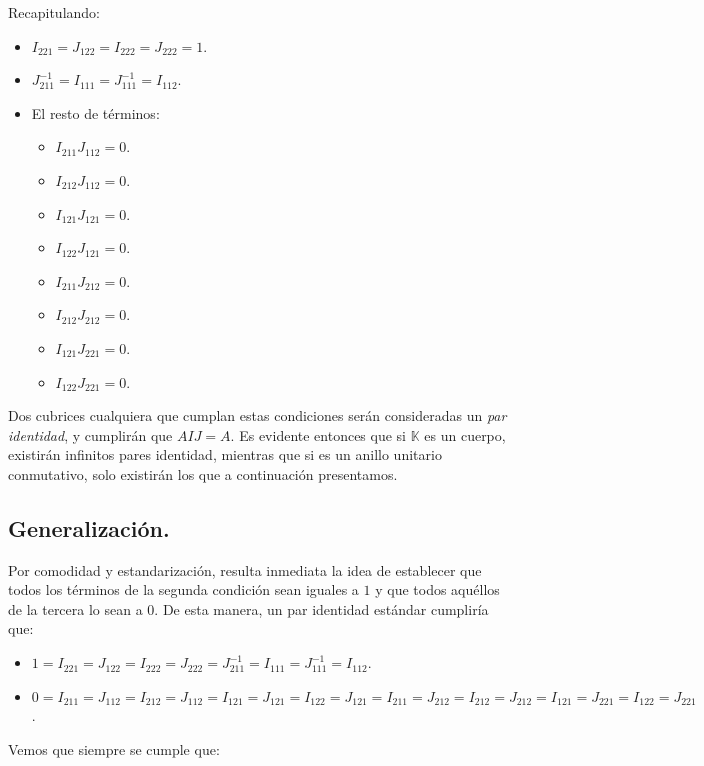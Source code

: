 \documentclass[a4paper, titlepage]{article}
\begin{document}
Recapitulando:

\begin{itemize}
	\item $I_{221} = J_{122} = I_{222} = J_{222} = 1$.
	\item $J_{211}^{-1} = I_{111} = J_{111}^{-1} = I_{112}$.
	\item El resto de términos:

	\begin{itemize}
		\item $I_{211} J_{112} = 0$.
		\item $I_{212} J_{112} = 0$.
		\item $I_{121} J_{121} = 0$.
		\item $I_{122} J_{121} = 0$.
		\item $I_{211} J_{212} = 0$.
		\item $I_{212} J_{212} = 0$.
		\item $I_{121} J_{221} = 0$.
		\item $I_{122} J_{221} = 0$.
	\end{itemize}
\end{itemize}

Dos cubrices cualquiera que cumplan estas condiciones serán consideradas un \textit{par identidad}, y cumplirán que $AIJ = A$. Es evidente entonces que si $\mathbb{K}$ es un cuerpo, existirán infinitos pares identidad, mientras que si es un anillo unitario conmutativo, solo existirán los que a continuación presentamos.

\subsection{Generalización.}

Por comodidad y estandarización, resulta inmediata la idea de establecer que todos los términos de la segunda condición sean iguales a $1$ y que todos aquéllos de la tercera lo sean a $0$. De esta manera, un par identidad estándar cumpliría que:

\begin{itemize}
	\item $1 = I_{221} = J_{122} = I_{222} = J_{222} = J_{211}^{-1} = I_{111} = J_{111}^{-1} = I_{112}$.
	\item $0 = I_{211} = J_{112} = I_{212} = J_{112} = I_{121} = J_{121} = I_{122} = J_{121} = I_{211} = J_{212} = I_{212} = J_{212} = I_{121} = J_{221} = I_{122} = J_{221}$.
\end{itemize}

Vemos que siempre se cumple que:
\end{document}

